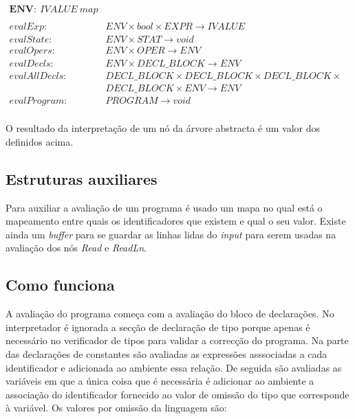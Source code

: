 {
\fontsize{9pt}{10}\selectfont
\ttfamily
$
\begin{array}{lll}
\textbf{ENV}:~IVALUE~map\\\\
evalExp:		&ENV \times bool \times EXPR \rightarrow IVALUE\\
evalState:		&ENV \times STAT \rightarrow void\\
evalOpers:		&ENV \times	OPER \rightarrow ENV\\
evalDecls:		&ENV \times DECL\_BLOCK \rightarrow ENV\\
evalAllDecls:	&DECL\_BLOCK \times DECL\_BLOCK \times DECL\_BLOCK \times \\
				&DECL\_BLOCK \times ENV \rightarrow ENV\\
evalProgram:	&PROGRAM \rightarrow void\\
\end{array}
$
}

O resultado da interpretação de um nó da árvore abstracta é um valor dos 
definidos acima.

\subsection{Estruturas auxiliares}

Para auxiliar a avaliação de um programa é usado um mapa no qual está o 
mapeamento entre quais os identificadores que existem e qual o seu valor. 
Existe ainda um \emph{buffer} para se guardar as linhas lidas do \emph{input} 
para serem usadas na avaliação dos nós \emph{Read} e \emph{ReadLn}.

\subsection{Como funciona}
A avaliação do programa começa com a avaliação do bloco de declarações. No 
interpretador é ignorada a secção de declaração de tipo porque apenas é 
necessário no verificador de tipos para validar a correcção do programa. Na 
parte das declarações de constantes são avaliadas as expressões asssociadas a 
cada identificador e adicionada ao ambiente essa relação. De seguida são 
avaliadas as variáveis em que a única coisa que é necessária é adicionar ao 
ambiente a associação do identificador fornecido ao valor de omissão do tipo 
que corresponde à variável. Os valores por omissão da linguagem são:

